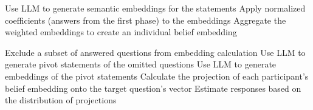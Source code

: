 \begin{algorithm}
\begin{algorithmic}[1]
\State

        \State Use LLM to generate semantic embeddings for the statements
        \State Apply normalized coefficients (answers from the first phase) to the embeddings
        \State Aggregate the weighted embeddings to create an individual belief embedding
    \EndFor
\EndProcedure

\State

    \State Exclude a subset of answered questions from embedding calculation
    \State Use LLM to generate pivot statements of the omitted questions
    \State Use LLM to generate embeddings of the pivot statements
    \State Calculate the projection of each participant's belief embedding onto the target question's vector
    \State Estimate responses based on the distribution of projections
\EndProcedure

\State

\end{algorithmic}
\end{algorithm}

